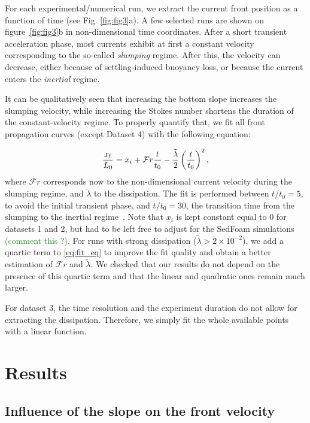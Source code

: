 \documentclass[twocolumn]{article}
\newcommand*{\cyril}{\textcolor{ForestGreen}}
\begin{document}
For each experimental/numerical run, we extract the current front position as a function of time (see Fig. \ref{fig:fig3}a). A few selected runs are shown on figure~\ref{fig:fig3}b in non-dimensional time coordinates. After a short transient acceleration phase, most currents exhibit at first a constant velocity corresponding to the so-called \emph{slumping} regime. After this, the velocity can decrease, either because of settling-induced buoyancy loss, or because the current enters the \emph{inertial} regime.

It can be qualitatively seen that increasing the bottom slope increases the slumping velocity, while increasing the Stokes number shortens the duration of the constant-velocity regime.
%
To properly quantify that, we fit all front propagation curves (except Dataset 4) with the following equation:

\begin{equation}
	\label{eq:fit_eq}
	\frac{x_{\rm f}}{L_{0}} = x_{i} + \mathcal{F}r \frac{t}{t_{0}} - \frac{\tilde{\lambda}}{2} \left(\frac{t}{t_{0}}\right)^{2},
\end{equation}
where $\mathcal{F}r$ corresponds now to the non-dimensional current velocity during the slumping regime, and $\tilde{\lambda}$ to the dissipation. The fit is performed between $t/t_{0} = 5$, to avoid the initial transient phase, and $t/t_{0} = 30$, the transition time from the slumping to the inertial regime~\citep{refs}. Note that $x_{i}$ is kept constant equal to 0 for datasets 1 and 2, but had to be left free to adjust for the SedFoam simulations \cyril{(comment this ?)}. For runs with strong dissipation ($\tilde{\lambda} > 2 {\times} 10^{-2}$), we add a quartic term to \eqref{eq:fit_eq} to improve the fit quality and obtain a better estimation of $\mathcal{F}r$ and $\tilde{\lambda}$. We checked that our results do not depend on the presence of this quartic term and that the linear and quadratic ones remain much larger.

For dataset 3, the time resolution and the experiment duration do not allow for extracting the dissipation. Therefore, we simply fit the whole available points with a linear function.

\section{Results}

\subsection{Influence of the slope on the front velocity}
\end{document}
